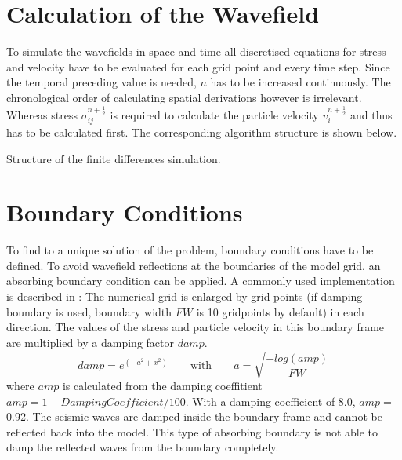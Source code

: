 \documentclass[pdftex,a4paper,parskip,listof=totoc,bibliography=totoc,onehalfspacing,12pt]{scrreprt}
\begin{document}
\section{Calculation of the Wavefield}
To simulate the wavefields in space and time all discretised equations for stress and velocity have to be evaluated for each grid point and every time step. Since the temporal preceding value is needed, $n$ has to be increased continuously. The chronological order of calculating spatial derivations however is irrelevant. Whereas stress $\sigma_{ij}^{n+\frac{1}{2}}$ is required to calculate the particle velocity $v_i^{n+\frac{1}{2}}$ and thus has to be calculated first. The corresponding algorithm structure is shown below. 
\begin{algorithm}
\caption{Structure of the finite differences simulation.}
\label{alg:FD}
\end{algorithm}

\section{Boundary Conditions}
To find to a unique solution of the problem, boundary conditions have to be defined. 
To avoid wavefield reflections at the boundaries of the model grid, an absorbing boundary condition can be applied. A commonly used implementation is described in \cite{cerjan:85}: The numerical grid is enlarged by grid points (if damping boundary is used, boundary width $FW$  is 10 gridpoints by default) in each direction. The values of the stress and particle velocity in this boundary frame are multiplied by a damping factor $damp$.
\begin{equation}
	damp= e^{\left(-a^2+x^2\right)} \qquad \text{with} \qquad a= \sqrt{\frac{-log(amp)}{FW}}
\end{equation}
where $amp$ is calculated from the damping coeffitient $amp= 1-{DampingCoefficient}/{100}$. With a damping coefficient of \SI{8.0}{}, $amp=$ \SI{0.92}{}. The seismic waves are damped inside the boundary frame and cannot be reflected back into the model. This type of absorbing boundary is not able to damp the reflected waves from the boundary completely.
\end{document}
